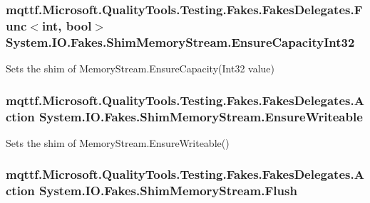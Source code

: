 \hypertarget{class_system_1_1_i_o_1_1_fakes_1_1_shim_memory_stream_a800d6de02e7597b40bd59c3f79948085}{
\subsubsection[{Ensure\-Capacity\-Int32}]{\setlength{\rightskip}{0pt plus 5cm}mqttf.\-Microsoft.\-Quality\-Tools.\-Testing.\-Fakes.\-Fakes\-Delegates.\-Func$<$int, bool$>$ System.\-I\-O.\-Fakes.\-Shim\-Memory\-Stream.\-Ensure\-Capacity\-Int32\hspace{0.3cm}{\ttfamily [set]}}}\label{class_system_1_1_i_o_1_1_fakes_1_1_shim_memory_stream_a800d6de02e7597b40bd59c3f79948085}


Sets the shim of Memory\-Stream.\-Ensure\-Capacity(\-Int32 value)

\hypertarget{class_system_1_1_i_o_1_1_fakes_1_1_shim_memory_stream_a77e0eb2277bb63ac47d66c72edcfdcbe}{
\subsubsection[{Ensure\-Writeable}]{\setlength{\rightskip}{0pt plus 5cm}mqttf.\-Microsoft.\-Quality\-Tools.\-Testing.\-Fakes.\-Fakes\-Delegates.\-Action System.\-I\-O.\-Fakes.\-Shim\-Memory\-Stream.\-Ensure\-Writeable\hspace{0.3cm}{\ttfamily [set]}}}\label{class_system_1_1_i_o_1_1_fakes_1_1_shim_memory_stream_a77e0eb2277bb63ac47d66c72edcfdcbe}


Sets the shim of Memory\-Stream.\-Ensure\-Writeable()

\hypertarget{class_system_1_1_i_o_1_1_fakes_1_1_shim_memory_stream_a7d00bda223f8ed2d83e0f675e31b789f}{
\subsubsection[{Flush}]{\setlength{\rightskip}{0pt plus 5cm}mqttf.\-Microsoft.\-Quality\-Tools.\-Testing.\-Fakes.\-Fakes\-Delegates.\-Action System.\-I\-O.\-Fakes.\-Shim\-Memory\-Stream.\-Flush\hspace{0.3cm}{\ttfamily [set]}}}\label{class_system_1_1_i_o_1_1_fakes_1_1_shim_memory_stream_a7d00bda223f8ed2d83e0f675e31b789f}


